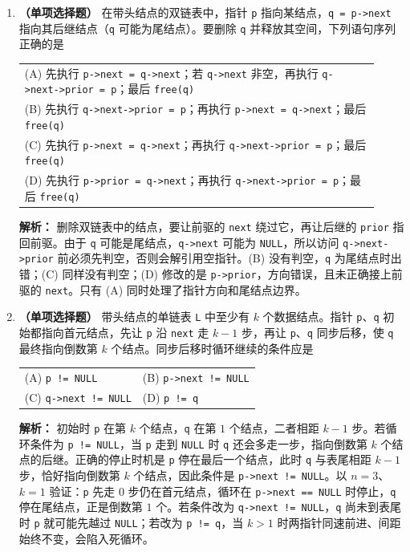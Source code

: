 \begin{enumerate}
\item \textbf{（单项选择题）} 在带头结点的双链表中，指针 \texttt{p} 指向某结点，\texttt{q = p->next} 指向其后继结点（\texttt{q} 可能为尾结点）。要删除 \texttt{q} 并释放其空间，下列语句序列正确的是

\begin{center}
\begin{tabular}{p{0.92\linewidth}}
(A) 先执行 \texttt{p->next = q->next}；若 \texttt{q->next} 非空，再执行 \texttt{q->next->prior = p}；最后 \texttt{free(q)} \\[4pt]
(B) 先执行 \texttt{q->next->prior = p}；再执行 \texttt{p->next = q->next}；最后 \texttt{free(q)} \\[4pt]
(C) 先执行 \texttt{p->next = q->next}；再执行 \texttt{q->next->prior = p}；最后 \texttt{free(q)} \\[4pt]
(D) 先执行 \texttt{p->prior = q->next}；再执行 \texttt{q->next->prior = p}；最后 \texttt{free(q)} \\
\end{tabular}
\end{center}

\ifshowsolutions\par\noindent\textbf{解析：} 删除双链表中的结点，要让前驱的 \texttt{next} 绕过它，再让后继的 \texttt{prior} 指回前驱。由于 \texttt{q} 可能是尾结点，\texttt{q->next} 可能为 \texttt{NULL}，所以访问 \texttt{q->next->prior} 前必须先判空，否则会解引用空指针。(B) 没有判空，\texttt{q} 为尾结点时出错；(C) 同样没有判空；(D) 修改的是 \texttt{p->prior}，方向错误，且未正确接上前驱的 \texttt{next}。只有 (A) 同时处理了指针方向和尾结点边界。\else \answerarea \fi

\item \textbf{（单项选择题）} 带头结点的单链表 \texttt{L} 中至少有 $k$ 个数据结点。指针 \texttt{p}、\texttt{q} 初始都指向首元结点，先让 \texttt{p} 沿 \texttt{next} 走 $k-1$ 步，再让 \texttt{p}、\texttt{q} 同步后移，使 \texttt{q} 最终指向倒数第 $k$ 个结点。同步后移时循环继续的条件应是

\begin{center}
\begin{tabular}{ll}
(A) \texttt{p != NULL} & (B) \texttt{p->next != NULL} \\[6pt]
(C) \texttt{q->next != NULL} & (D) \texttt{p != q}
\end{tabular}
\end{center}

\ifshowsolutions\par\noindent\textbf{解析：} 初始时 \texttt{p} 在第 $k$ 个结点，\texttt{q} 在第 $1$ 个结点，二者相距 $k-1$ 步。若循环条件为 \texttt{p != NULL}，当 \texttt{p} 走到 \texttt{NULL} 时 \texttt{q} 还会多走一步，指向倒数第 $k$ 个结点的后继。正确的停止时机是 \texttt{p} 停在最后一个结点，此时 \texttt{q} 与表尾相距 $k-1$ 步，恰好指向倒数第 $k$ 个结点，因此条件是 \texttt{p->next != NULL}。以 $n=3$、$k=1$ 验证：\texttt{p} 先走 $0$ 步仍在首元结点，循环在 \texttt{p->next == NULL} 时停止，\texttt{q} 停在尾结点，正是倒数第 $1$ 个。若条件改为 \texttt{q->next != NULL}，\texttt{q} 尚未到表尾时 \texttt{p} 就可能先越过 \texttt{NULL}；若改为 \texttt{p != q}，当 $k>1$ 时两指针同速前进、间距始终不变，会陷入死循环。\else \answerarea \fi


\end{enumerate}
